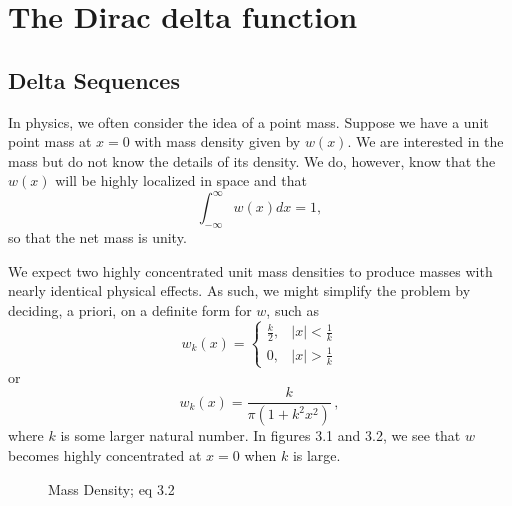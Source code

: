 \section{The Dirac delta function}
\setcounter{example}{0}
\subsection{Delta Sequences}
In physics, we often consider the idea of a point mass. Suppose we have a unit point mass at \(x=0\) with mass density given by \(w(x)\). We are interested in the mass but do not know the details of its density. We do, however, know that the \(w(x)\) will be highly localized in space and that 
\begin{equation}
    \int_{-\infty}^{\infty} w(x) dx = 1,
\end{equation}
so that the net mass is unity.

We expect two highly concentrated unit mass densities to produce masses with nearly identical physical effects. As such, we might simplify the problem by deciding, a priori, on a definite form for \(w\), such as
\begin{equation}
    w_k(x) = \begin{cases}
        \frac{k}{2}, & |x|<\frac{1}{k}\\
        0, & |x|>\frac{1}{k}
    \end{cases}
\end{equation}
or
\begin{equation}
    w_k(x)=\frac{k}{\pi (1+k^2x^2)}\,,
\end{equation}
where \(k\) is some larger natural number. In figures 3.1 and 3.2, we see that \(w\) becomes highly concentrated at \(x=0\) when \(k\) is large.

\begin{figure}
    \centering
    \caption{Mass Density; eq 3.2}
\end{figure}

